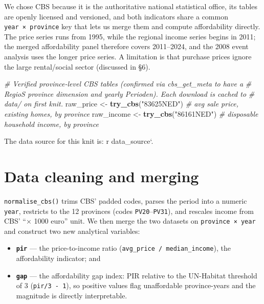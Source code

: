 \documentclass[
]{article}
\newenvironment{Shaded}{\begin{snugshade}}{\end{snugshade}}
\newcommand{\CommentTok}[1]{\textcolor[rgb]{0.56,0.35,0.01}{\textit{#1}}}
\newcommand{\FunctionTok}[1]{\textcolor[rgb]{0.13,0.29,0.53}{\textbf{#1}}}
\newcommand{\NormalTok}[1]{#1}
\newcommand{\OtherTok}[1]{\textcolor[rgb]{0.56,0.35,0.01}{#1}}
\newcommand{\StringTok}[1]{\textcolor[rgb]{0.31,0.60,0.02}{#1}}
\providecommand{\tightlist}{%
  \setlength{\itemsep}{0pt}\setlength{\parskip}{0pt}}
\begin{document}
We chose CBS because it is the authoritative national statistical
office, its tables are openly licensed and versioned, and both
indicators share a common \texttt{year\ ×\ province} key that lets us
merge them and compute affordability directly. The price series runs
from 1995, while the regional income series begins in 2011; the merged
affordability panel therefore covers 2011--2024, and the 2008 event
analysis uses the longer price series. A limitation is that purchase
prices ignore the large rental/social sector (discussed in §6).

\begin{Shaded}
\begin{Highlighting}[]
\CommentTok{\# Verified province{-}level CBS tables (confirmed via cbs\_get\_meta to have a}
\CommentTok{\# RegioS province dimension and yearly Perioden). Each download is cached to}
\CommentTok{\# data/ on first knit.}
\NormalTok{raw\_price  }\OtherTok{\textless{}{-}} \FunctionTok{try\_cbs}\NormalTok{(}\StringTok{"83625NED"}\NormalTok{)   }\CommentTok{\# avg sale price, existing homes, by province}
\NormalTok{raw\_income }\OtherTok{\textless{}{-}} \FunctionTok{try\_cbs}\NormalTok{(}\StringTok{"86161NED"}\NormalTok{)   }\CommentTok{\# disposable household income, by province}
\end{Highlighting}
\end{Shaded}

The data source for this knit is: r data\_source`.

\section{Data cleaning and merging}\label{data-cleaning-and-merging}

\texttt{normalise\_cbs()} trims CBS' padded codes, parses the period
into a numeric \texttt{year}, restricts to the 12 provinces (codes
\texttt{PV20}--\texttt{PV31}), and rescales income from CBS' ``× 1000
euro'' unit. We then merge the two datasets on
\texttt{province\ ×\ year} and construct two new analytical variables:

\begin{itemize}
\tightlist
\item
  \textbf{\texttt{pir}} --- the price-to-income ratio
  (\texttt{avg\_price\ /\ median\_income}), the affordability indicator;
  and
\item
  \textbf{\texttt{gap}} --- the affordability gap index: PIR relative to
  the UN-Habitat threshold of 3 (\texttt{pir/3\ -\ 1}), so positive
  values flag unaffordable province-years and the magnitude is directly
  interpretable.
\end{itemize}
\end{document}
